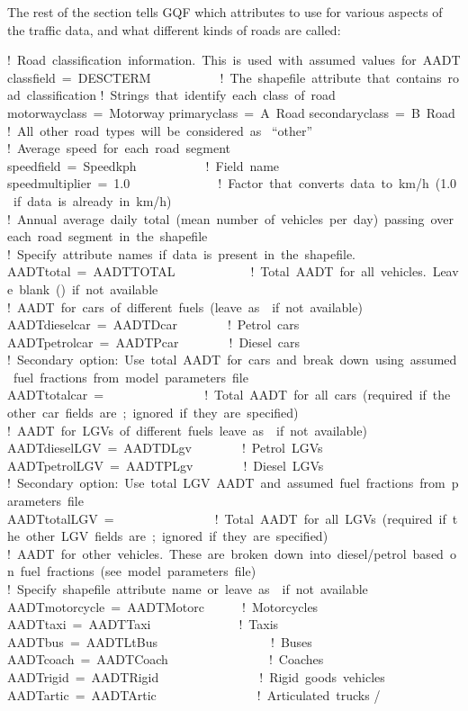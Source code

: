 \documentclass[letterpaper,10pt,english]{sphinxmanual}
\begin{document}
The rest of the section tells GQF which attributes to use for various
aspects of the traffic data, and what different kinds of roads are
called:

%
\begin{sphinxVerbatim}[commandchars=\\\{\}]
    ! Road classification information. This is used with assumed values for AADT
    class\PYGZus{}field = \PYGZsq{}DESC\PYGZus{}TERM\PYGZsq{}           ! The shapefile attribute that contains road classification
    ! Strings that identify each class of road
    motorway\PYGZus{}class = \PYGZsq{}Motorway\PYGZsq{}
    primary\PYGZus{}class = \PYGZsq{}A Road\PYGZsq{}
    secondary\PYGZus{}class = \PYGZsq{}B Road\PYGZsq{}
    ! All other road types will be considered as \PYGZbs{} “other”
    ! Average speed for each road segment
    speed\PYGZus{}field = \PYGZsq{}Speed\PYGZus{}kph\PYGZsq{}           ! Field name
    speed\PYGZus{}multiplier = 1.0              ! Factor that converts data to km/h (1.0 if data is already in km/h)
    ! Annual average daily total (mean number of vehicles per day) passing over each road segment in the shapefile
    ! Specify attribute names if data is present in the shapefile.
    AADT\PYGZus{}total = \PYGZsq{}AADTTOTAL\PYGZsq{}            ! Total AADT for all vehicles. Leave blank (\PYGZsq{}\PYGZsq{}) if not available
    ! AADT for cars of different fuels (leave as \PYGZsq{}\PYGZsq{} if not available)
    AADT\PYGZus{}diesel\PYGZus{}car = \PYGZsq{}AADTDcar\PYGZsq{}        ! Petrol cars
    AADT\PYGZus{}petrol\PYGZus{}car = \PYGZsq{}AADTPcar\PYGZsq{}        ! Diesel cars
    ! Secondary option: Use total AADT for cars and break down using assumed fuel fractions from model parameters file
    AADT\PYGZus{}total\PYGZus{}car = \PYGZsq{}\PYGZsq{}               ! Total AADT for all cars (required if the other car fields are \PYGZsq{}\PYGZsq{}; ignored if they are specified)
    ! AADT for LGVs of different fuels leave as \PYGZsq{}\PYGZsq{} if not available)
    AADT\PYGZus{}diesel\PYGZus{}LGV = \PYGZsq{}AADTDLgv\PYGZsq{}        ! Petrol LGVs
    AADT\PYGZus{}petrol\PYGZus{}LGV = \PYGZsq{}AADTPLgv\PYGZsq{}        ! Diesel LGVs
    ! Secondary option: Use total LGV AADT and assumed fuel fractions from parameters file
    AADT\PYGZus{}total\PYGZus{}LGV = \PYGZsq{}\PYGZsq{}               ! Total AADT for all LGVs (required if the other LGV fields are \PYGZsq{}\PYGZsq{}; ignored if they are specified)
    ! AADT for other vehicles. These are broken down into diesel/petrol based on fuel fractions (see model parameters file)
    ! Specify shapefile attribute name or leave as \PYGZsq{}\PYGZsq{} if not available
    AADT\PYGZus{}motorcycle = \PYGZsq{}AADTMotorc\PYGZsq{}      ! Motorcycles
    AADT\PYGZus{}taxi = \PYGZsq{}AADTTaxi\PYGZsq{}              ! Taxis
    AADT\PYGZus{}bus = \PYGZsq{}AADTLtBus\PYGZsq{}                  ! Buses
    AADT\PYGZus{}coach = \PYGZsq{}AADTCoach\PYGZsq{}                ! Coaches
    AADT\PYGZus{}rigid = \PYGZsq{}AADTRigid\PYGZsq{}                ! Rigid goods vehicles
    AADT\PYGZus{}artic = \PYGZsq{}AADTArtic\PYGZsq{}                ! Articulated trucks
/
\end{sphinxVerbatim}
\end{document}
